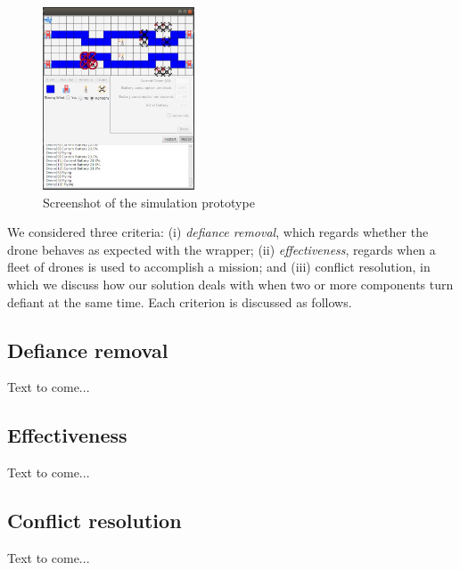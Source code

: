 \begin{figure}[h]\centering
 \includegraphics[width=0.4\textwidth]{figures/simulation.jpg}
 \caption{Screenshot of the simulation prototype}
 \label{fig:simulator}
 \vspace*{-0.5cm}
\end{figure}

We considered three criteria: (i) \textit{defiance removal}, which regards whether the drone behaves as expected with the wrapper; (ii) \textit{effectiveness}, regards when a fleet of drones is used to accomplish a mission; and (iii) conflict resolution, in which we discuss how our solution deals with when two or more components turn defiant at the same time. Each criterion is discussed as follows.

\subsection{Defiance removal}

Text to come...

\subsection{Effectiveness}

Text to come...

\subsection{Conflict resolution}

Text to come...


